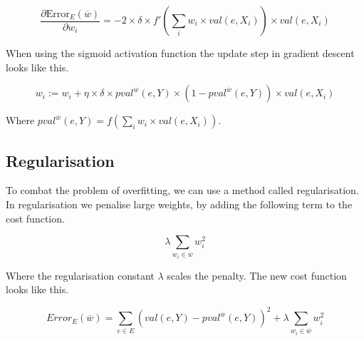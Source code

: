\[ \frac{\partial \text{Error}_E(\overline{w})}{\partial w_i} 
	= -2 \times \delta \times f'\left(\sum_i w_i \times val(e,X_i)\right) \times val(e,X_i) \]

When using the sigmoid activation function the update step in gradient descent looks like this.

\[ w_i := w_i + \eta \times \delta \times pval^{\overline{w}}(e,Y) \times \left(1 - pval^{\overline{w}}(e,Y)\right) \times val(e,X_i) \]

Where $pval^{\overline{w}}(e,Y) = f(\sum_i w_i \times val(e,X_i))$.  


\begin{flushright}
\cite[p. 306-307]{AI2010}
\end{flushright}


\subsection{Regularisation}\label{sec:regular}
To combat the problem of overfitting, we can use a method called regularisation.
In regularisation we penalise large weights, by adding the following term to the cost function.


\[ \lambda \sum_{w_i \in \overline{w}} w_i^2 \]

Where the regularisation constant $\lambda$ scales the penalty. 
The new cost function looks like this.

\[ Error_E(\overline{w}) = \sum_{e \in E} \left(val(e,Y) - pval^{\overline{w}}(e,Y)\right)^2 + \lambda \sum_{w_i \in \overline{w}} w_i^2 \]


\begin{flushright}
\cite[online course]{courseraAI}
\end{flushright}














